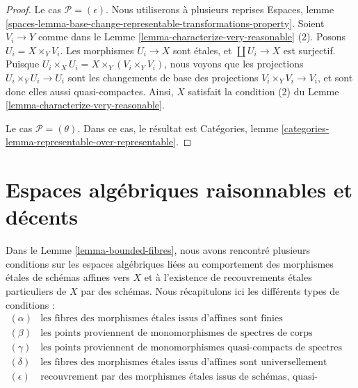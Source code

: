 \begin{proof}
\medskip\noindent
Le cas $\mathcal{P} = (\epsilon)$. Nous utiliserons à plusieurs reprises
Espaces, lemme
\ref{spaces-lemma-base-change-representable-transformations-property}.
Soient $V_i \to Y$ comme dans le
Lemme \ref{lemma-characterize-very-reasonable} (2).
Posons $U_i = X \times_Y V_i$. Les morphismes $U_i \to X$ sont étales,
et $\coprod U_i \to X$ est surjectif. Puisque
$U_i \times_X U_i = X \times_Y (V_i \times_Y V_i)$, nous voyons que les
projections $U_i \times_Y U_i \to U_i$ sont les changements de base des
projections $V_i \times_Y V_i \to V_i$, et sont donc elles aussi
quasi-compactes. Ainsi, $X$ satisfait la condition (2) du
Lemme \ref{lemma-characterize-very-reasonable}.

\medskip\noindent
Le cas $\mathcal{P} = (\theta)$. Dans ce cas, le résultat est
Catégories, lemme \ref{categories-lemma-representable-over-representable}.
\end{proof}












\section{Espaces algébriques raisonnables et décents}
\label{section-reasonable-decent}

\noindent
Dans le
Lemme \ref{lemma-bounded-fibres},
nous avons rencontré plusieurs conditions sur les espaces algébriques liées
au comportement des morphismes étales de schémas affines vers $X$
et à l'existence de recouvrements étales particuliers de $X$ par des
schémas. Nous récapitulons ici les différents types de conditions :
$$
\boxed{
\begin{matrix}
(\alpha) & \text{les fibres des morphismes étales issus d'affines
sont finies} \\
(\beta) & \text{les points proviennent de monomorphismes
de spectres de corps} \\
(\gamma) & \text{les points proviennent de monomorphismes quasi-compacts de
spectres de corps} \\
(\delta) & \text{les fibres des morphismes étales issus d'affines sont
universellement bornées} \\
(\epsilon) & \text{recouvrement par des morphismes étales issus de schémas,
quasi-compacts sur leur image}
\end{matrix}
}
$$

